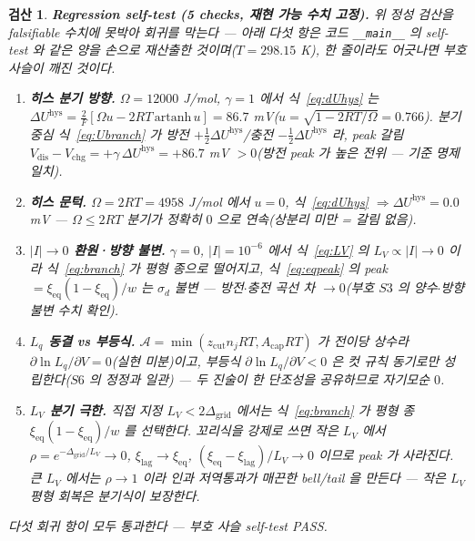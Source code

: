 \documentclass[11pt,a4paper]{article}
\newtheorem*{verifybox}{검산}
\newcommand{\eq}{\mathrm{eq}}
\newcommand{\dis}{\mathrm{dis}}
\newcommand{\chg}{\mathrm{chg}}
\newcommand{\hys}{\mathrm{hys}}
\newcommand{\code}[1]{\texttt{#1}}
\begin{document}
\begin{verifybox}
\textbf{Regression self-test (5 checks, 재현 가능 수치 고정).} 위 정성 검산을 falsifiable 수치에 못박아 회귀를 막는다 — 아래
다섯 항은 코드 \code{\_\_main\_\_} 의 self-test 와 같은 양을 손으로 재산출한 것이며($T=298.15$ K), 한 줄이라도 어긋나면
부호 사슬이 깨진 것이다.
\begin{enumerate}[label=\textbf{R\arabic*.},leftmargin=2.6em,itemsep=1pt]
\item \textbf{히스 분기 방향.} $\Omega=12000$ J/mol, $\gamma=1$ 에서 식~\eqref{eq:dUhys} 는
$\Delta U^\hys=\frac{2}{F}[\Omega u-2RT\,\mathrm{artanh}\,u]=86.7$ mV($u=\sqrt{1-2RT/\Omega}=0.766$). 분기 중심
식~\eqref{eq:Ubranch} 가 방전 $+\tfrac12\Delta U^\hys$/충전 $-\tfrac12\Delta U^\hys$ 라, peak 갈림
$V_\dis-V_\chg=+\gamma\,\Delta U^\hys=+86.7$ mV $>0$(방전 peak 가 높은 전위 — 기준 명제 일치).
\item \textbf{히스 문턱.} $\Omega=2RT=4958$ J/mol 에서 $u=0$, 식~\eqref{eq:dUhys} $\Rightarrow\Delta U^\hys=0.0$ mV —
$\Omega\le2RT$ 분기가 정확히 $0$ 으로 연속(상분리 미만 = 갈림 없음).
\item \textbf{$|I|\!\to\!0$ 환원·방향 불변.} $\gamma=0$, $|I|=10^{-6}$ 에서 식~\eqref{eq:LV} 의 $L_V\propto|I|\to0$ 이라
식~\eqref{eq:branch} 가 평형 종으로 떨어지고, 식~\eqref{eq:eqpeak} 의 peak $=\xi_\eq(1-\xi_\eq)/w$ 는 $\sigma_d$ 불변 —
방전$\cdot$충전 곡선 차 $\to0$(부호 $S3$ 의 양수$\cdot$방향 불변 수치 확인).
\item \textbf{$L_q$ 동결 vs 부등식.} $\mathcal A=\min(z_\mathrm{cut}n_jRT,A_\mathrm{cap}RT)$ 가 전이당 상수라
$\partial\ln L_q/\partial V=0$(실현 미분)이고, 부등식 $\partial\ln L_q/\partial V<0$ 은 컷 규칙 동기로만 성립한다($S6$ 의
정정과 일관) — 두 진술이 한 단조성을 공유하므로 자기모순 $0$.
\item \textbf{$L_V$ 분기 극한.} 직접 지정 $L_V<2\Delta_\mathrm{grid}$ 에서는 식~\eqref{eq:branch} 가 평형 종
$\xi_\eq(1-\xi_\eq)/w$ 를 선택한다. 꼬리식을 강제로 쓰면 작은 $L_V$ 에서 $\rho=e^{-\Delta_\mathrm{grid}/L_V}\to0$,
$\xi_\mathrm{lag}\to\xi_\eq$, $(\xi_\eq-\xi_\mathrm{lag})/L_V\to0$ 이므로 peak 가 사라진다. 큰 $L_V$ 에서는
$\rho\to1$ 이라 인과 저역통과가 매끈한 bell/tail 을 만든다 — 작은 $L_V$ 평형 회복은 분기식이 보장한다.
\end{enumerate}
다섯 회귀 항이 모두 통과한다 — 부호 사슬 self-test PASS.
\end{verifybox}
\end{document}
